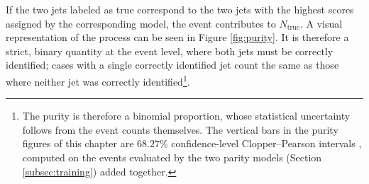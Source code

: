 If the two jets labeled as true correspond to the two jets with the highest scores assigned by the corresponding model, the event contributes to $N_{\mathrm{true}}$. A visual representation of the process can be seen in Figure \ref{fig:purity}. It is therefore a strict, binary quantity at the event level, where both jets must be correctly identified; cases with a single correctly identified jet count the same as those where neither jet was correctly identified\footnote{The purity is therefore a binomial proportion, whose statistical uncertainty follows from the event counts themselves. The vertical bars in the purity figures of this chapter are $68.27\%$ confidence-level Clopper--Pearson intervals \cite{ClopperPearson1934}, computed on the events evaluated by the two parity models (Section \ref{subsec:training}) added together.}.\medskip
%
\providecommand{\jetglyph}[4]{%
  \node[#4] (#1) at (#2,#3) {};
  \fill[black!45] (#2-0.19,#3+0.13) circle (0.42mm);
  \fill[black!45] (#2+0.16,#3+0.06) circle (0.42mm);
  \fill[black!45] (#2-0.06,#3-0.16) circle (0.42mm);
  \fill[black!45] (#2+0.21,#3-0.19) circle (0.42mm);
  \fill[black!45] (#2-0.22,#3-0.05) circle (0.42mm);
}
